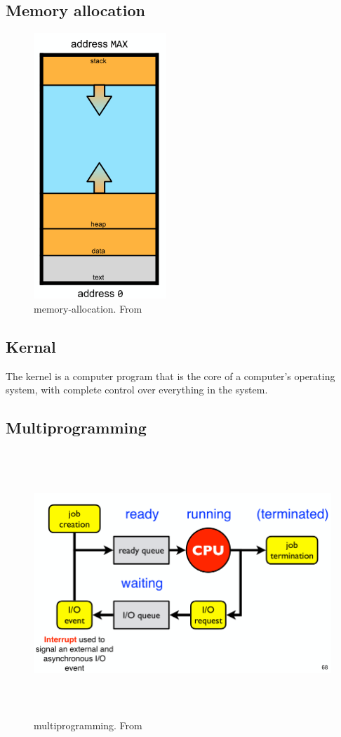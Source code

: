 \begin{multicols}{2}
\subsection{Memory allocation}
\begin{figure}[h]
    \vspace{10mm}
    \centering
    \includegraphics[width=5cm, height=10cm]{image/memory-allocation.png}
    \caption{memory-allocation. From \cite{}}
\end{figure}

\subsection{Kernal}
The kernel is a computer program
that is the core of a computer’s
operating system, with complete
control over everything in the
system.

\subsection{Multiprogramming}
\begin{figure}[h]
    \vspace{10mm}
    \centering
    \includegraphics[width=14cm, height=10cm]{image/multiprogramming.png}
    \caption{multiprogramming. From \cite{}}
\end{figure}


\end{multicols}
